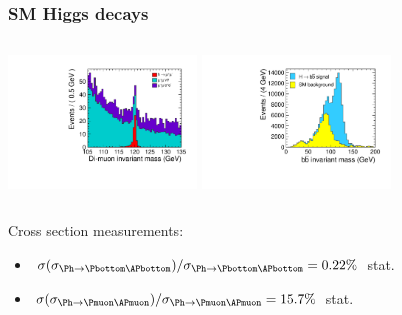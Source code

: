 \documentclass{beamer}
\begin{document}
\begin{frame}
\frametitle{SM Higgs decays}
\begin{columns}[c]
\column{6cm}
\centering
\includegraphics[width=5cm]{../SIDWorkshop/ee_h_mumu_mass_mh120GeV}
\column{6cm}
\centering
\includegraphics[width=5cm]{../SIDWorkshop/ee_h_bb_mass_mh120GeV}
\end{columns}
Cross section measurements:
\begin{itemize}
  \item
  $\sigma(\sigma_{\Ph\to\Pbottom\APbottom})/\sigma_{\Ph\to\Pbottom\APbottom} =
  0.22\%$ stat.
  \item $\sigma(\sigma_{\Ph\to\Pmuon\APmuon})/\sigma_{\Ph\to\Pmuon\APmuon}
  = 15.7\%$ stat.
\end{itemize}
\end{frame}
\end{document}
